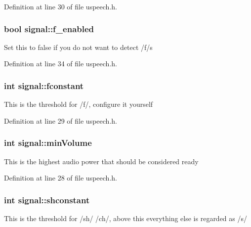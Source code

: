 Definition at line 30 of file uspeech.\-h.

\hypertarget{classsignal_aaecf78836054e8f13a6caaf340d0b3c9}{
\subsubsection[{f\-\_\-enabled}]{\setlength{\rightskip}{0pt plus 5cm}bool signal\-::f\-\_\-enabled}}\label{classsignal_aaecf78836054e8f13a6caaf340d0b3c9}
Set this to false if you do not want to detect /f/s 

Definition at line 34 of file uspeech.\-h.

\hypertarget{classsignal_ae256fa87a2b25841cda3155d0519172c}{
\subsubsection[{fconstant}]{\setlength{\rightskip}{0pt plus 5cm}int signal\-::fconstant}}\label{classsignal_ae256fa87a2b25841cda3155d0519172c}
This is the threshold for /f/, configure it yourself 

Definition at line 29 of file uspeech.\-h.

\hypertarget{classsignal_a4604a8a9760752f00af96457a34debf9}{
\subsubsection[{min\-Volume}]{\setlength{\rightskip}{0pt plus 5cm}int signal\-::min\-Volume}}\label{classsignal_a4604a8a9760752f00af96457a34debf9}
This is the highest audio power that should be considered ready 

Definition at line 28 of file uspeech.\-h.

\hypertarget{classsignal_a6697308a69e450ec5322b8438a442b36}{
\subsubsection[{shconstant}]{\setlength{\rightskip}{0pt plus 5cm}int signal\-::shconstant}}\label{classsignal_a6697308a69e450ec5322b8438a442b36}
This is the threshold for /sh/ /ch/, above this everything else is regarded as /s/ 

